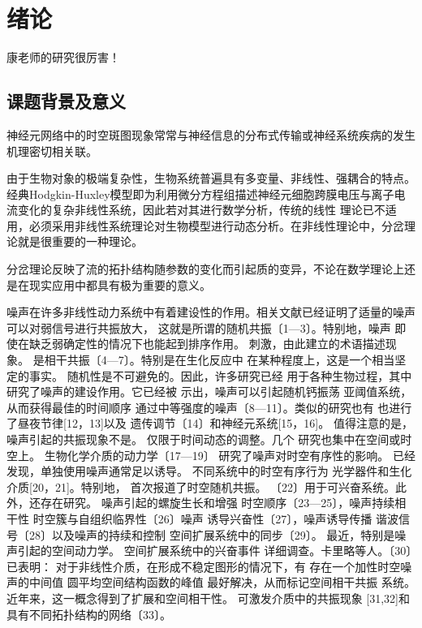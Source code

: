 \documentclass[
pdflinks,
]{xjtuthesis}
\begin{document}


% 
% 
\xjtucinfopage
\xjtueinfopage
\xjtutoc

\xjtucontent

\chapter{绪论}

康老师的研究\cite{xie2008change}很厉害！

\section{课题背景及意义}
神经元网络中的时空斑图现象常常与神经信息的分布式传输或神经系统疾病的发生机理密切相关联。

由于生物对象的极端复杂性，生物系统普遍具有多变量、非线性、强耦合的特点。经典Hodgkin-Huxley模型即为利用微分方程组描述神经元细胞跨膜电压与离子电流变化的复杂非线性系统，因此若对其进行数学分析，传统的线性
理论已不适用，必须采用非线性系统理论对生物模型进行动态分析。在非线性理论中，分岔理论就是很重要的一种理论。

分岔理论反映了流的拓扑结构随参数的变化而引起质的变异，不论在数学理论上还
是在现实应用中都具有极为重要的意义。

噪声在许多非线性动力系统中有着建设性的作用。相关文献已经证明了适量的噪声可以对弱信号进行共振放大，
这就是所谓的随机共振〔1—3〕。特别地，噪声
即使在缺乏弱确定性的情况下也能起到排序作用。
刺激，由此建立的术语描述现象。
是相干共振〔4—7〕。特别是在生化反应中
在某种程度上，这是一个相当坚定的事实。
随机性是不可避免的。因此，许多研究已经
用于各种生物过程，其中
研究了噪声的建设作用。它已经被
示出，噪声可以引起随机钙振荡
亚阈值系统，从而获得最佳的时间顺序
通过中等强度的噪声〔8—11〕。类似的研究也有
也进行了昼夜节律[12，13]以及
遗传调节〔14〕和神经元系统[15，16]。
值得注意的是，噪声引起的共振现象不是。
仅限于时间动态的调整。几个
研究也集中在空间或时空上。
生物化学介质的动力学〔17—19〕
研究了噪声对时空有序性的影响。
已经发现，单独使用噪声通常足以诱导。
不同系统中的时空有序行为
光学器件和生化介质[20，21]。特别地，
首次报道了时空随机共振。
〔22〕用于可兴奋系统。此外，还存在研究。
噪声引起的螺旋生长和增强
时空顺序〔23—25〕，噪声持续相干性
时空簇与自组织临界性〔26〕噪声
诱导兴奋性〔27〕，噪声诱导传播
谐波信号〔28〕以及噪声的持续和控制
空间扩展系统中的同步〔29〕。
最近，特别是噪声引起的空间动力学。
空间扩展系统中的兴奋事件
详细调查。卡里略等人。〔30〕已表明：
对于非线性介质，在形成不稳定图形的情况下，有
存在一个加性时空噪声的中间值
圆平均空间结构函数的峰值
最好解决，从而标记空间相干共振
系统。近年来，这一概念得到了扩展和空间相干性。
可激发介质中的共振现象
[31,32]和具有不同拓扑结构的网络〔33〕。
\end{document}
